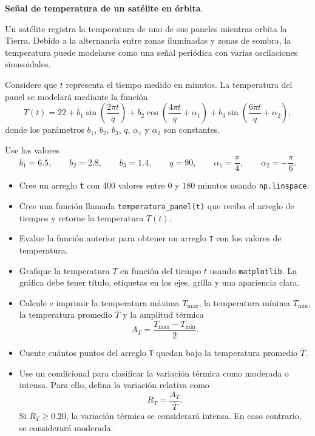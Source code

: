 \providecommand{\Needspace}[1]{}
\Needspace{8\baselineskip}
\item \textbf{Señal de temperatura de un satélite en órbita}.
\nopagebreak[4]

\begin{tcolorbox}[colback=blue!2!white,colframe=blue!55!black,title={Enunciado},breakable]
Un satélite registra la temperatura de uno de sus paneles mientras orbita la Tierra. Debido a la alternancia entre zonas iluminadas y zonas de sombra, la temperatura puede modelarse como una señal periódica con varias oscilaciones sinusoidales.

Considere que $t$ representa el tiempo medido en minutos. La temperatura del panel se modelará mediante la función
\[
T(t)
=
22
+
b_1 \sin\left(\frac{2\pi t}{q}\right)
+
b_2 \cos\left(\frac{4\pi t}{q}+\alpha_1\right)
+
b_3 \sin\left(\frac{6\pi t}{q}+\alpha_2\right),
\]
donde los parámetros $b_1$, $b_2$, $b_3$, $q$, $\alpha_1$ y $\alpha_2$ son constantes.

Use los valores
\[
b_1 = 6.5,
\qquad
b_2 = 2.8,
\qquad
b_3 = 1.4,
\qquad
q = 90,
\qquad
\alpha_1 = \frac{\pi}{4},
\qquad
\alpha_2 = -\frac{\pi}{6}.
\]

\begin{itemize}
    \item[(a)] Cree un arreglo \texttt{t} con $400$ valores entre $0$ y $180$ minutos usando \texttt{np.linspace}.

    \item[(b)] Cree una función llamada \texttt{temperatura\_panel(t)} que reciba el arreglo de tiempos y retorne la temperatura $T(t)$.

    \item[(c)] Evalue la función anterior para obtener un arreglo \texttt{T} con los valores de temperatura.

    \item[(d)] Grafique la temperatura $T$ en función del tiempo $t$ usando \texttt{matplotlib}. La gráfica debe tener título, etiquetas en los ejes, grilla y una apariencia clara.

    \item[(e)] Calcule e imprimir la temperatura máxima $T_{\max}$, la temperatura mínima $T_{\min}$, la temperatura promedio $\overline{T}$ y la amplitud térmica
    \[
    A_T = \frac{T_{\max}-T_{\min}}{2}.
    \]

    \item[(f)] Cuente cuántos puntos del arreglo \texttt{T} quedan bajo la temperatura promedio $\overline{T}$.

    \item[(g)] Use un condicional para clasificar la variación térmica como moderada o intensa. Para ello, defina la variación relativa como
    \[
    R_T=\frac{A_T}{\overline{T}}.
    \]
    Si $R_T \geq 0.20$, la variación térmica se considerará intensa. En caso contrario, se considerará moderada.
\end{itemize}
\end{tcolorbox}

